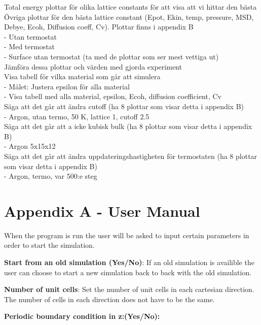 \documentclass[12pt,a4paper]{article}
\begin{document}
Total energy plottar för olika lattice constants för att visa att vi hittar den bästa\\
Övriga plottar för den bästa lattice constant (Epot, Ekin, temp, pressure, MSD, Debye, Ecoh, Diffusion coeff, Cv). Plottar finns i appendix B\\
	- Utan termostat\\
	- Med termostat\\
	- Surface utan termostat (ta med de plottar som ser mest vettiga ut)\\
Jämföra dessa plottar och värden med gjorda experiment\\
Visa tabell för vilka material som går att simulera\\
	- Målet: Justera epsilon för alla material\\
	- Visa tabell med alla material, epsilon, Ecoh, diffusion coefficient, Cv\\
Säga att det går att ändra cutoff (ha 8 plottar som visar detta i appendix B)\\
	- Argon, utan termo, 50 K, lattice 1, cutoff 2.5\\
Säga att det går att a icke kubisk bulk (ha 8 plottar som visar detta i appendix B)\\
	- Argon 5x15x12\\
Säga att det går att ändra uppdateringshastigheten för termostaten (ha 8 plottar som visar detta i appendix B)\\
	- Argon, termo, var 500:e steg\\

\newpage

\section*{Appendix A - User Manual}

\label{sec:AppendixA}
When the program is run the user will be asked to input certain parameters in order to start the simulation.

\textbf{Start from an old simulation (Yes/No)}: If an old simulation is availible the user can choose to start a new simulation back to back with the old simulation.  

\textbf{Number of unit cells}: Set the number of unit cells in each cartesian direction. The number of cells in each direction does not have to be the same.

\textbf{Periodic boundary condition in z:(Yes/No):} 
\end{document}

